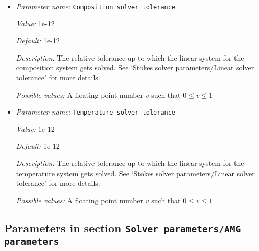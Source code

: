\begin{itemize}
\item {\it Parameter name:} {\tt Composition solver tolerance}
\label{parameters:Solver parameters/Composition solver tolerance}
\label{parameters:Solver_20parameters/Composition_20solver_20tolerance}


{\it Value:} 1e-12


{\it Default:} 1e-12


{\it Description:} The relative tolerance up to which the linear system for the composition system gets solved. See `Stokes solver parameters/Linear solver tolerance' for more details.


{\it Possible values:} A floating point number $v$ such that $0 \leq v \leq 1$
\item {\it Parameter name:} {\tt Temperature solver tolerance}
\label{parameters:Solver parameters/Temperature solver tolerance}
\label{parameters:Solver_20parameters/Temperature_20solver_20tolerance}


{\it Value:} 1e-12


{\it Default:} 1e-12


{\it Description:} The relative tolerance up to which the linear system for the temperature system gets solved. See `Stokes solver parameters/Linear solver tolerance' for more details.


{\it Possible values:} A floating point number $v$ such that $0 \leq v \leq 1$
\end{itemize}



\subsection{Parameters in section \tt Solver parameters/AMG parameters}
\label{parameters:Solver_20parameters/AMG_20parameters}

